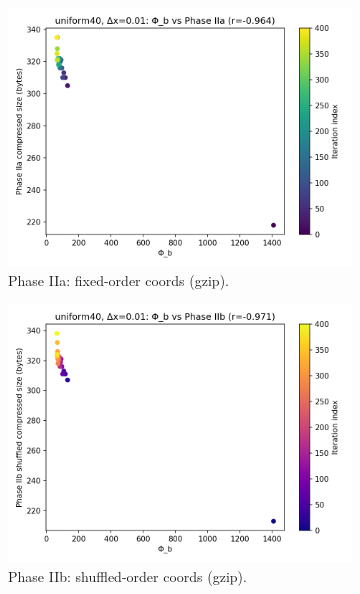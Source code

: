 \documentclass[11pt,a4paper]{article}
\numberwithin{equation}{section}
\begin{document}
\begin{figure}[h!]
\centering
\begin{subfigure}[b]{0.32\textwidth}
\includegraphics[width=\textwidth]{figures/uniform40_dx0.01_phib_vs_phase2a.png}
\caption{Phase IIa: fixed-order coords (gzip).}
\end{subfigure}\hfill
\begin{subfigure}[b]{0.32\textwidth}
\includegraphics[width=\textwidth]{figures/uniform40_dx0.01_phib_vs_phase2b.png}
\caption{Phase IIb: shuffled-order coords (gzip).}
\end{subfigure}\hfill
\begin{subfigure}[b]{0.32\textwidth}

\end{subfigure}
\end{figure}
\end{document}

